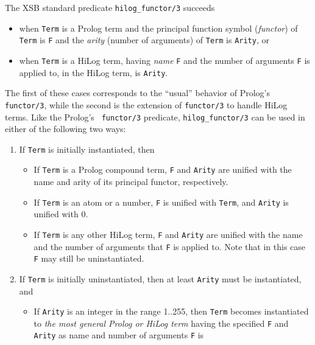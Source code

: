 \begin{description}
%
    The XSB standard predicate {\tt hilog\_functor/3} succeeds 
    \begin{itemize}
    \item when {\tt Term} is a Prolog term and the principal function 
          symbol ({\em functor}) of {\tt Term} is {\tt F} and the
          {\em arity} (number of arguments) of {\tt Term} is 
          {\tt Arity}, or
    \item when {\tt Term} is a HiLog term, having {\em name} {\tt F} 
          and the number of arguments {\tt F} is applied to, in the 
          HiLog term, is {\tt Arity}.
    \end{itemize}
    The first of these cases corresponds to the ``usual'' behavior of
    Prolog's {\tt functor/3}, while the second is the extension of
    {\tt functor/3} to handle HiLog terms. Like the Prolog's {\tt
    functor/3} predicate, {\tt hilog\_functor/3} can be used in either
    of the following two ways:
    \begin{enumerate}
    \item If {\tt Term} is initially instantiated, then
          \begin{itemize}
          \item If {\tt Term} is a Prolog compound term, {\tt F} and 
                {\tt Arity} are unified with the name and arity of 
                its principal functor, respectively.
          \item If {\tt Term} is an atom or a number, {\tt F} is unified 
                with {\tt Term}, and {\tt Arity} is unified with 0.
          \item If {\tt Term} is any other HiLog term, {\tt F} and {\tt Arity} 
                are unified with the name and the number of arguments 
                that {\tt F} is applied to. Note that in this case {\tt F}
                may still be uninstantiated.
          \end{itemize}
    \item If {\tt Term} is initially uninstantiated, then at least
          {\tt Arity} must be instantiated, and
          \begin{itemize}
          \item If {\tt Arity} is an integer in the range 1..255, then
                {\tt Term} becomes instantiated to {\em the most general 
                Prolog or HiLog term} having the specified {\tt F} and 
                {\tt Arity} as name and number of arguments {\tt F} is 

\end{itemize}
\end{enumerate}
\end{description}
